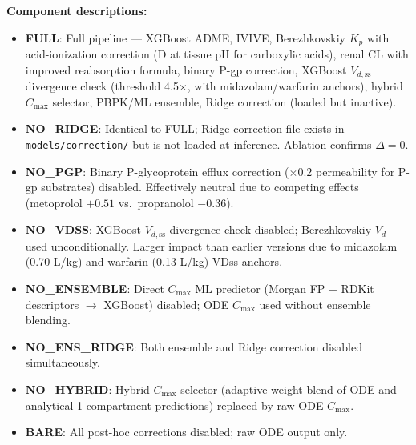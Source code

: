 \documentclass[12pt,a4paper]{article}
\begin{document}
\bigskip

\noindent\textbf{Component descriptions:}
\begin{itemize}
  \item \textbf{FULL}: Full pipeline — XGBoost ADME, IVIVE, Berezhkovskiy $K_p$ with acid-ionization correction
    (D at tissue pH for carboxylic acids), renal CL with improved reabsorption formula,
    binary P-gp correction, XGBoost $V_{d,\text{ss}}$ divergence check (threshold 4.5$\times$, with midazolam/warfarin anchors),
    hybrid $C_{\max}$ selector, PBPK/ML ensemble, Ridge correction (loaded but inactive).
  \item \textbf{NO\_RIDGE}: Identical to FULL; Ridge correction file exists in \texttt{models/correction/}
    but is not loaded at inference. Ablation confirms $\Delta=0$.
  \item \textbf{NO\_PGP}: Binary P-glycoprotein efflux correction ($\times 0.2$ permeability for P-gp
    substrates) disabled. Effectively neutral due to competing effects (metoprolol $+0.51$ vs.\ propranolol $-0.36$).
  \item \textbf{NO\_VDSS}: XGBoost $V_{d,\text{ss}}$ divergence check disabled; Berezhkovskiy $V_d$
    used unconditionally. Larger impact than earlier versions due to midazolam (0.70 L/kg) and warfarin (0.13 L/kg) VDss anchors.
  \item \textbf{NO\_ENSEMBLE}: Direct $C_{\max}$ ML predictor (Morgan FP + RDKit descriptors $\to$
    XGBoost) disabled; ODE $C_{\max}$ used without ensemble blending.
  \item \textbf{NO\_ENS\_RIDGE}: Both ensemble and Ridge correction disabled simultaneously.
  \item \textbf{NO\_HYBRID}: Hybrid $C_{\max}$ selector (adaptive-weight blend of ODE and analytical
    1-compartment predictions) replaced by raw ODE $C_{\max}$.
  \item \textbf{BARE}: All post-hoc corrections disabled; raw ODE output only.
\end{itemize}
\end{document}

